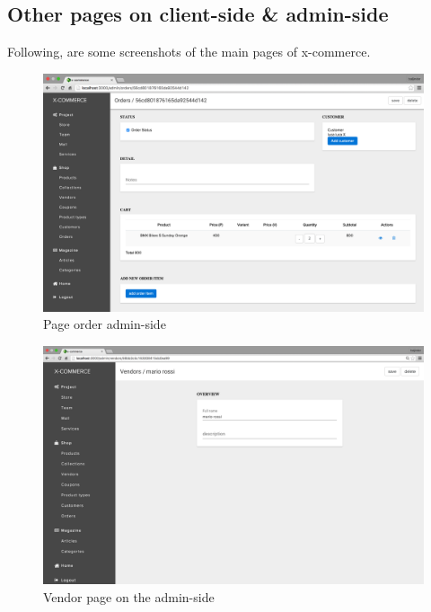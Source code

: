 \subsection{Other pages on client-side \& admin-side}
Following, are some screenshots of the main pages of x-commerce.
\newline
\begin{figure}[htb]
\centering
\includegraphics[width=1.0\linewidth]{images/chapter4/page-order-all.png}\hfill
\caption[page order admin-side]{Page order admin-side}
\label{fig:page_order_admin}
\end{figure}
\newpage
\begin{figure}[htb]
\centering
\includegraphics[width=0.84\linewidth]{images/chapter4/page-vendor-all.png}\hfill
\caption[Vendor page on the  admin-side]{Vendor page on the admin-side}
\label{fig:page_vendor_admin}
\end{figure}

